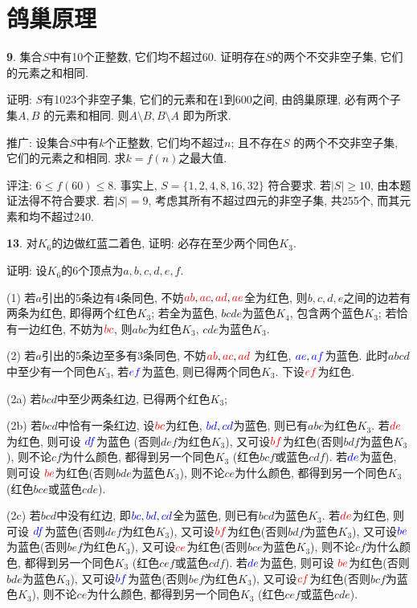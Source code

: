 \section{鸽巢原理}
\par \textbf{9}. 集合$S$中有10个正整数, 它们均不超过60. 证明存在$S$的两个不交非空子集, 它们的元素之和相同.
\par 证明: $S$有1023个非空子集, 它们的元素和在1到600之间, 由鸽巢原理, 必有两个子集$A,B$ 的元素和相同. 则$A\setminus B,B\setminus A$ 即为所求.
\par 推广: 设集合$S$中有$k$个正整数, 它们均不超过$n$; 且不存在$S$ 的两个不交非空子集, 它们的元素之和相同. 求$k=f(n)$之最大值.
\par 评注: $6\le f(60)\le 8$. 事实上, $S=\{1,2,4,8,16,32\}$ 符合要求. 若$|S|\ge 10$, 由本题证法得不符合要求. 若$|S|=9$, 考虑其所有不超过四元的非空子集, 共255个, 而其元素和均不超过240.

\par \textbf{13}. 对$K_6$的边做红蓝二着色, 证明: 必存在至少两个同色$K_3$.
\par 证明: 设$K_6$的6个顶点为$a,b,c,d,e,f$.
\par (1) 若$a$引出的5条边有4条同色, 不妨$\textcolor{red}{ab},\textcolor{red}{ac},
\textcolor{red}{ad},\textcolor{red}{ae}$全为红色, 则$b,c,d,e$之间的边若有两条为红色, 即得两个红色$K_3$; 若全为蓝色, $bcde$为蓝色$K_4$, 包含两个蓝色$K_3$; 若恰有一边红色, 不妨为$\textcolor{red}{bc}$, 则$abc$为红色$K_3$, $cde$为蓝色$K_3$.
\par (2) 若$a$引出的5条边至多有3条同色, 不妨$\textcolor{red}{ab},\textcolor{red}{ac},\textcolor{red}{ad} $ 为红色, $\textcolor{blue}{ae},\textcolor{blue}{af}$为蓝色. 此时$abcd$中至少有一个同色$K_3$, 若$\textcolor{blue}{ef}$为蓝色, 则已得两个同色$K_3$. 下设$\textcolor{red}{ef}$为红色.
\par (2a) 若$bcd$中至少两条红边, 已得两个红色$K_3$;
\par (2b) 若$bcd$中恰有一条红边, 设$\textcolor{red}{bc}$为红色, $\textcolor{blue}{bd},
\textcolor{blue}{cd}$为蓝色, 则已有$abc$为红色$K_3$. 若$\textcolor{red}{de}$为红色, 则可设
$\textcolor{blue}{df}$为蓝色 (否则$def$为红色$K_3$), 又可设$\textcolor{red}{bf}$为红色(否则$bdf$为蓝色$K_3$), 则不论$cf$为什么颜色, 都得到另一个同色$K_3$ (红色$bcf$或蓝色$cdf$).
若$\textcolor{blue}{de}$为蓝色, 则可设
$\textcolor{red}{be}$为红色(否则$bde$为蓝色$K_3$), 则不论$ce$为什么颜色, 都得到另一个同色$K_3$ (红色$bce$或蓝色$cde$).
\par (2c) 若$bcd$中没有红边, 即$\textcolor{blue}{bc},\textcolor{blue}{bd},
\textcolor{blue}{cd}$全为蓝色, 则已有$bcd$为蓝色$K_3$.
若$\textcolor{red}{de}$为红色, 则可设
$\textcolor{blue}{df}$为蓝色(否则$def$为红色$K_3$), 又可设$\textcolor{red}{bf}$为红色(否则$bdf$为蓝色$K_3$), 又可设$\textcolor{blue}{be}$为蓝色(否则$bef$为红色$K_3$), 又可设$\textcolor{red}{ce}$为红色(否则$bce$为蓝色$K_3$), 则不论$cf$为什么颜色, 都得到另一个同色$K_3$ (红色$cef$或蓝色$cdf$).
若$\textcolor{blue}{de}$为蓝色, 则可设
$\textcolor{red}{be}$为红色(否则$bde$为蓝色$K_3$), 又可设$\textcolor{blue}{bf}$为蓝色(否则$bef$为红色$K_3$), 又可设$\textcolor{red}{cf}$为红色(否则$bcf$为蓝色$K_3$), 则不论$ce$为什么颜色, 都得到另一个同色$K_3$ (红色$cef$或蓝色$cde$).

